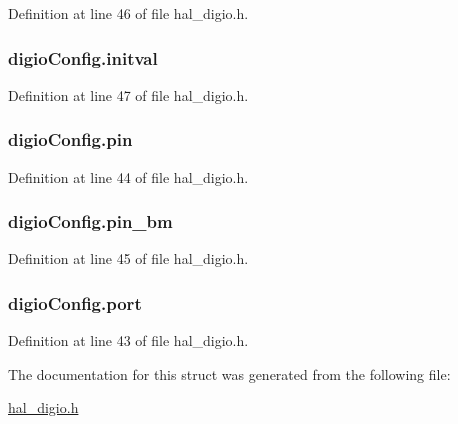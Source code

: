 Definition at line 46 of file hal\_\-digio.h.

\hypertarget{structdigio_config_aef87584f20450c75a803358d7370ffbc}{
\subsubsection[{initval}]{ {\bf digioConfig.initval}}}
\label{structdigio_config_aef87584f20450c75a803358d7370ffbc}


Definition at line 47 of file hal\_\-digio.h.

\hypertarget{structdigio_config_afaad59b890aa416753468661d6dc5336}{
\subsubsection[{pin}]{ {\bf digioConfig.pin}}}
\label{structdigio_config_afaad59b890aa416753468661d6dc5336}


Definition at line 44 of file hal\_\-digio.h.

\hypertarget{structdigio_config_a2c5420292518ad9ac5fb7d3ca93552a1}{
\subsubsection[{pin\_\-bm}]{ {\bf digioConfig.pin\_\-bm}}}
\label{structdigio_config_a2c5420292518ad9ac5fb7d3ca93552a1}


Definition at line 45 of file hal\_\-digio.h.

\hypertarget{structdigio_config_a54688988bc7641c2849746e8cdf87702}{
\subsubsection[{port}]{ {\bf digioConfig.port}}}
\label{structdigio_config_a54688988bc7641c2849746e8cdf87702}


Definition at line 43 of file hal\_\-digio.h.



The documentation for this struct was generated from the following file:\begin{DoxyCompactItemize}
\item 
\hyperlink{hal__digio_8h}{hal\_\-digio.h}\end{DoxyCompactItemize}
